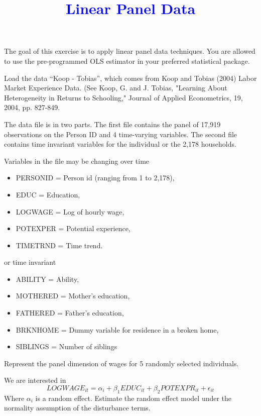 \documentclass[10pt,a4paper]{article}
\newcommand{\1}{\mathds{1}}
\begin{document}
\doublespacing

\title{\textcolor{blue}{Linear Panel Data}}
\maketitle

The goal of this exercise is to apply linear panel data techniques. You are allowed to use the pre-programmed OLS estimator in your preferred statistical package.


\begin{Exercise}[title=Data]
Load the data ``Koop - Tobias'', which comes from
Koop and Tobias (2004) Labor Market Experience Data.   
(See Koop, G. and J. Tobias, "Learning About Heterogeneity in Returns to Schooling," Journal of Applied Econometrics, 19, 2004, pp. 827-849.

The data file is in two parts. The first file contains the panel of 17,919 observations on the Person ID and 4 time-varying variables. The second file contains time invariant variables for the individual or the 2,178 households. 

Variables in the file may be changing over time 
\begin{itemize}
\item PERSONID = Person id (ranging from 1 to 2,178),
\item EDUC = Education,
\item LOGWAGE = Log of hourly wage,
\item POTEXPER = Potential experience,
\item TIMETRND = Time trend.
\end{itemize}

or time invariant
\begin{itemize}
\item ABILITY = Ability,
\item MOTHERED = Mother's education,
\item FATHERED = Father's education,
\item BRKNHOME = Dummy variable for residence in a broken home,
\item SIBLINGS = Number of siblings
\end{itemize}
Represent the panel dimension of wages for 5 randomly selected individuals. 
\end{Exercise}


\begin{Exercise}[title=Random Effects]
We are interested in
\begin{equation}
 LOGWAGE_{it} = \alpha_i + \beta_{1} EDUC_{it} + \beta_{2} POTEXPR_{it} + \epsilon_{it} 
\end{equation}
Where $\alpha_i$ is a random effect. Estimate the random effect model under the normality assumption of the disturbance terms. 
\end{Exercise}
\end{document}
